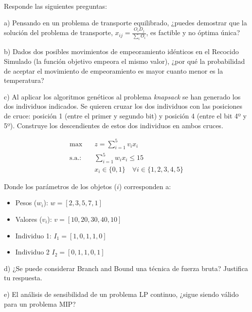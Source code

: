 Responde las siguientes preguntas:

a) Pensando en un problema de transporte equilibrado, ¿puedes demostrar que la solución del problema de transporte, $x_{ij}=\frac{O_i D_j }{\sum _i O_i}$, es factible y no óptima única?



b) Dados dos posibles movimientos de empeoramiento idénticos en el Recocido Simulado (la función objetivo empeora el mismo valor), ¿por qué la probabilidad de aceptar el movimiento de empeoramiento es mayor cuanto menor es la temperatura?




c) Al aplicar los algoritmos genéticos al problema \textit{knapsack} se han generado los dos individuos indicados. Se quieren cruzar los dos individuos con las posiciones de cruce: posición 1 (entre el primer y segundo bit) y posición 4 (entre el bit 4º y 5º). Construye los descendientes de estos dos individuos en ambos cruces.

\begin{align}
\max \quad & z = \sum_{i=1}^{5} v_i x_i \\
\text{s.a.:} \quad 
& \sum_{i=1}^{5} w_i x_i \le 15 \\
& x_i \in \{0,1\} \quad \forall i \in \{1,2,3,4,5\}
\end{align}

Donde los parámetros de los objetos ($i$) corresponden a:
\begin{itemize}
    \item Pesos ($w_i$): $w = [2, 3, 5, 7, 1]$
    \item Valores ($v_i$): $v = [10, 20, 30, 40, 10]$
\end{itemize}

\begin{itemize}
    \item Individuo 1: $I_1 = [1, 0, 1, 1, 0]$
    \item Individuo 2 $I_2 = [0, 1, 1, 0, 1]$
    
\end{itemize}


d) ¿Se puede considerar Branch and Bound una técnica de fuerza bruta? Justifica tu respuesta.



e) El análisis de sensibilidad de un problema LP continuo, ¿sigue siendo válido para un problema MIP?